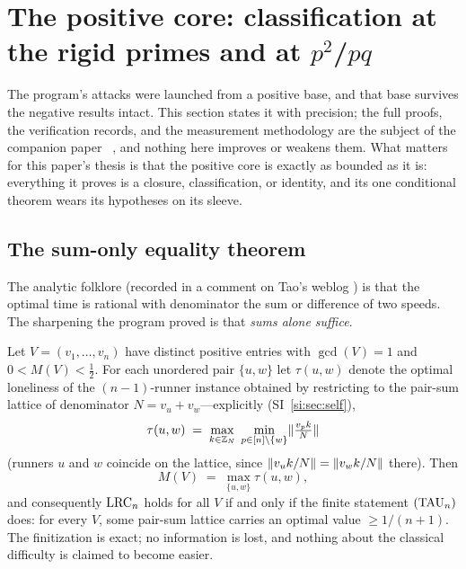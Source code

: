 
\section{The positive core: classification at the rigid primes and at
\boldmath$p^2$/$pq$}\label{sec:positive}

The program's attacks were launched from a positive base, and that base
survives the negative results intact. This section states it with
precision; the full proofs, the verification records, and the
measurement methodology are the subject of the companion paper~\cite{companion-monograph}
\cite{prog-artifacts}, and nothing here improves or weakens them. What
matters for this paper's thesis is that the positive core is exactly as
bounded as it is: everything it proves is a closure, classification, or
identity, and its one conditional theorem wears its hypotheses on its
sleeve.

\subsection{The sum-only equality theorem}

The analytic folklore (recorded in a comment on Tao's weblog
\cite{Tao-blog}) is that the optimal time is rational with denominator
the sum or difference of two speeds. The sharpening the program proved
is that \emph{sums alone suffice}.

\begin{theorem}\label{thm:equality}
Let $V=(v_1,\dots,v_n)$ have distinct positive entries with
$\gcd(V)=1$ and $0<M(V)<\tfrac12$. For each unordered pair $\{u,w\}$
let $\tau(u,w)$ denote the optimal loneliness of the $(n-1)$-runner
instance obtained by restricting to the pair-sum lattice of denominator
$N=v_u+v_w$---explicitly (SI~\ref{si:sec:self}),
\[
\tau(u,w)\;=\;\max_{k\in\mathbb{Z}_{N}}\;\min_{p\in[n]\setminus\{w\}}
\lVert \tfrac{v_pk}{N} \rVert
\]
(runners $u$ and $w$ coincide on the lattice, since
$\lVert v_uk/N \rVert=\lVert v_wk/N \rVert$ there). Then
\[
M(V)\;=\;\max_{\{u,w\}}\tau(u,w),
\]
and consequently $\mathrm{LRC}_n$ holds for all $V$ if and only if the finite
statement $(\mathrm{TAU}_n)$ does: for every $V$, some pair-sum lattice
carries an optimal value $\ge 1/(n+1)$. The finitization is exact; no
information is lost, and nothing about the classical difficulty is
claimed to become easier.
\end{theorem}

